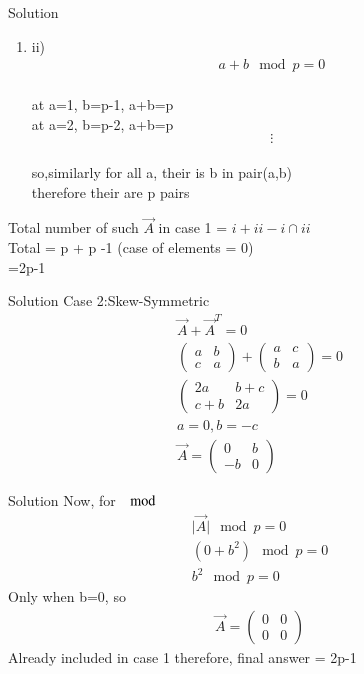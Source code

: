 \documentclass{beamer}
\begin{document}
\begin{frame}{Solution}
\begin{enumerate}[start=2]
    \item ii) \begin{align}
                a+b\mod p =0\\
            \end{align}
            \begin{center}    
                at a=1, b=p-1, a+b=p\\
                at a=2, b=p-2, a+b=p\\
                \[ \vdots \] \\
                so,similarly for all a, their is b in pair(a,b)\\
                therefore their are p pairs
            \end{center}
\end{enumerate}
Total number of such $\vec{A}$ in case 1 = ${i}+{ii}-{i\cap ii}$\\
Total = p + p -1 (case of elements = 0)\\
=2p-1
\end{frame}
\begin{frame}{Solution}
Case 2:Skew-Symmetric
\begin{align}
    \vec{A}+\vec{A}^T=0\\
    \begin{pmatrix}a&b\\c&a\end{pmatrix}+\begin{pmatrix}a&c\\b&a\end{pmatrix}=0\\
    \begin{pmatrix}2a&b+c\\c+b&2a\end{pmatrix}=0\\
    a=0,b=-c\\
    \vec{A}=\begin{pmatrix}0&b\\-b&0\end{pmatrix}
\end{align}
\end{frame}
\begin{frame}{Solution}
Now, for $\mod$
\begin{align}
    \vert \vec{A} \vert \mod p =0\\
    (0+b^2) \mod p=0\\
    b^2 \mod p=0
\end{align}
Only when b=0, so
\begin{align}
    \vec{A}=\begin{pmatrix}0&0\\0&0\end{pmatrix}
\end{align}
Already included in case 1
therefore, final answer = 2p-1
\end{frame}
\end{document}
